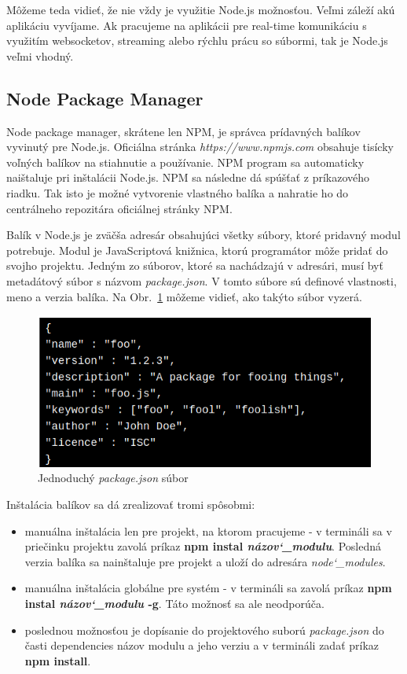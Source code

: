 \indent Môžeme teda vidieť, že nie vždy je využitie Node.js možnosťou. Veľmi záleží akú aplikáciu vyvíjame. Ak pracujeme na aplikácii pre real-time komunikáciu s využitím websocketov, streaming alebo rýchlu prácu so súbormi, tak je Node.js veľmi vhodný. 

\subsection{Node Package Manager}
\indent Node package manager, skrátene len NPM, je správca prídavných balíkov vyvinutý pre Node.js. Oficiálna stránka \textit{https://www.npmjs.com} obsahuje tisícky voľných balíkov na stiahnutie a používanie. NPM program sa automaticky naištaluje pri inštalácii Node.js. NPM sa následne dá spúšťať z príkazového riadku. Tak isto je možné vytvorenie vlastného balíka a nahratie ho do centrálneho repozitára oficiálnej stránky NPM.

\indent Balík v Node.js je zväčša adresár obsahujúci všetky súbory, ktoré pridavný modul potrebuje. Modul je JavaScriptová knižnica, ktorú programátor môže pridať do svojho projektu. Jedným zo súborov, ktoré sa nachádzajú v adresári, musí byť metadátový súbor s názvom \textit{package.json}. V tomto súbore sú definové vlastnosti, meno a verzia balíka. Na Obr.~\ref{fig:package} môžeme vidieť, ako takýto súbor vyzerá.  

\begin{figure}[H]
    \centering
    \includegraphics[scale=0.55]{img/package.png}
    \caption{Jednoduchý \textit{package.json} súbor}
    \label{fig:package}
\end{figure}

Inštalácia balíkov sa dá zrealizovať tromi spôsobmi:
\begin{itemize}
    \item manuálna inštalácia len pre projekt, na ktorom pracujeme - v termináli sa v priečinku projektu zavolá príkaz \textbf{npm instal \textit{názov\char`_modulu}}. Posledná verzia balíka sa nainštaluje pre projekt a uloží do adresára \textit{node\char`_modules}.
    \item manuálna inštalácia globálne pre systém - v termináli sa zavolá príkaz \textbf{npm instal \textit{názov\char`_modulu} -g}. Táto možnosť sa ale neodporúča.
    \item poslednou možnosťou je dopísanie do projektového suború \textit{package.json} do časti dependencies názov modulu a jeho verziu a v termináli zadať príkaz \textbf{npm install}.
\end{itemize}

